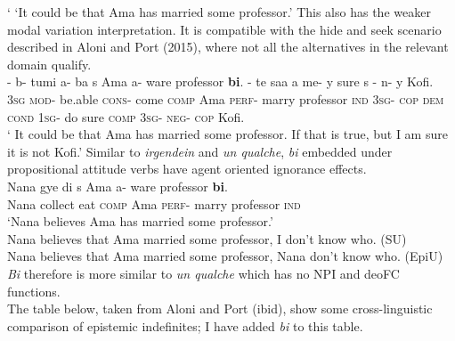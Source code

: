 \documentclass[output=paper,
modfonts
]{langsci/langscibook}
\begin{document}
\glt ` `It could be that Ama has married some professor.' 
\z 
This also has the weaker modal variation interpretation. It is compatible with the hide and seek scenario described in Aloni and Port (2015), where not all the alternatives in the relevant domain qualify.
\ea\label{ex42}\\
 \gll  {}- b- tumi a- ba s Ama a- ware professor \textbf{bi}. - te saa a  me- y sure s - n- y Kofi. \\
\textsc{3sg} 
 \textsc{mod}- be.able \textsc{cons}- come \textsc{comp} Ama \textsc{perf}- marry professor \textsc{ind} \textsc{3sg}- \textsc{cop} \textsc{dem} \textsc{cond} \textsc{1sg}- do sure \textsc{comp}  \textsc{3sg}- \textsc{neg}- \textsc{cop} Kofi. \\
\glt ` It could be that Ama has married some professor. If that is true, but I am sure it is not Kofi.' 
\z Similar to \emph{irgendein} and \emph{un qualche}, \emph{bi} embedded under propositional attitude verbs have agent oriented ignorance effects.  
 \ea\label{ex42}\\
 \gll  Nana gye di s Ama a- ware professor \textbf{bi}. \\
Nana collect eat \textsc{comp} Ama \textsc{perf}- marry professor \textsc{ind}\\
\glt `Nana believes Ama has married some professor.' \\
Nana believes that Ama married some professor, I don't know who. (SU)\\
Nana believes that Ama married some professor, Nana don't know who. (EpiU)
\z \emph{Bi} therefore is more similar to \emph{un qualche} which has no NPI and deoFC functions. \\
 The table below, taken from Aloni and Port (ibid), show some cross-linguistic comparison of epistemic indefinites; I have added \emph{bi} to this table.\\
\end{document}
